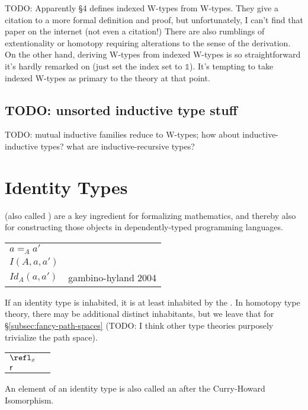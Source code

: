 \documentclass[11pt]{article} %
\theoremstyle{definition}
\theoremstyle{remark}
\begin{document}
TODO:
Apparently \cite{petersson-synek_1989} \S4 defines indexed W-types from W-types.
They give a citation to a more formal definition and proof, but unfortunately, I can't find that paper on the internet (not even a citation!)
There are also rumblings of extentionality or homotopy requiring alterations to the sense of the derivation.
On the other hand, deriving W-types from indexed W-types is so straightforward it's hardly remarked on (just set the index set to $\mathbb 1$).
It's tempting to take indexed W-types as primary to the theory at that point.

\subsection{TODO: unsorted inductive type stuff}

TODO: mutual inductive families reduce to W-types; how about inductive-inductive types? what are inductive-recursive types?


\section{Identity Types}
\label{sec:identity-types}

 (also called \cite{diy_1989}) are a key ingredient for formalizing mathematics, and thereby also for constructing those objects in dependently-typed programming languages.
\begin{center}
\renewcommand{\arraystretch}{1.2}
\begin{tabular}{lp{10cm}}
$a =_{\!A} a'$ & \cite{diy_1989}\cite{hottbook} \\
$I(A,a,a')$ & \cite{martin-lof_1984} \\
$Id_A(a, a')$ & gambino-hyland 2004
\end{tabular}
\end{center}
If an identity type is inhabited, it is at least inhabited by the .
In homotopy type theory, there may be additional distinct inhabitants, but we leave that for \S\ref{subsec:fancy-path-spaces} (TODO: I think other type theories purposely trivialize the path space).
\begin{center}
\renewcommand{\arraystretch}{1.2}
\begin{tabular}{lp{10cm}}
$\refl_x$ & \cite{hottbook} \\
$\mathsf{r}$ & \cite{martin-lof_1984} \\
\end{tabular}
\end{center}
An element of an identity type is also called an  after the Curry-Howard Isomorphism.
\end{document}
